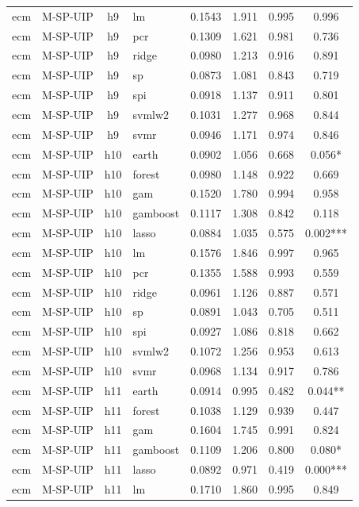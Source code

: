 \begin{ThreePartTable}
\begin{longtable}[t]{llclcccc}
ecm & M-SP-UIP & h9 & lm & 0.1543 & 1.911 & 0.995 & 0.996\\
ecm & M-SP-UIP & h9 & pcr & 0.1309 & 1.621 & 0.981 & 0.736\\
ecm & M-SP-UIP & h9 & ridge & 0.0980 & 1.213 & 0.916 & 0.891\\
ecm & M-SP-UIP & h9 & sp & 0.0873 & 1.081 & 0.843 & 0.719\\
ecm & M-SP-UIP & h9 & spi & 0.0918 & 1.137 & 0.911 & 0.801\\
ecm & M-SP-UIP & h9 & svmlw2 & 0.1031 & 1.277 & 0.968 & 0.844\\
ecm & M-SP-UIP & h9 & svmr & 0.0946 & 1.171 & 0.974 & 0.846\\
\addlinespace
ecm & M-SP-UIP & h10 & earth & 0.0902 & 1.056 & 0.668 & 0.056*\\
ecm & M-SP-UIP & h10 & forest & 0.0980 & 1.148 & 0.922 & 0.669\\
ecm & M-SP-UIP & h10 & gam & 0.1520 & 1.780 & 0.994 & 0.958\\
ecm & M-SP-UIP & h10 & gamboost & 0.1117 & 1.308 & 0.842 & 0.118\\
ecm & M-SP-UIP & h10 & lasso & 0.0884 & 1.035 & 0.575 & 0.002***\\
ecm & M-SP-UIP & h10 & lm & 0.1576 & 1.846 & 0.997 & 0.965\\
ecm & M-SP-UIP & h10 & pcr & 0.1355 & 1.588 & 0.993 & 0.559\\
ecm & M-SP-UIP & h10 & ridge & 0.0961 & 1.126 & 0.887 & 0.571\\
ecm & M-SP-UIP & h10 & sp & 0.0891 & 1.043 & 0.705 & 0.511\\
ecm & M-SP-UIP & h10 & spi & 0.0927 & 1.086 & 0.818 & 0.662\\
ecm & M-SP-UIP & h10 & svmlw2 & 0.1072 & 1.256 & 0.953 & 0.613\\
ecm & M-SP-UIP & h10 & svmr & 0.0968 & 1.134 & 0.917 & 0.786\\
\addlinespace
ecm & M-SP-UIP & h11 & earth & 0.0914 & 0.995 & 0.482 & 0.044**\\
ecm & M-SP-UIP & h11 & forest & 0.1038 & 1.129 & 0.939 & 0.447\\
ecm & M-SP-UIP & h11 & gam & 0.1604 & 1.745 & 0.991 & 0.824\\
ecm & M-SP-UIP & h11 & gamboost & 0.1109 & 1.206 & 0.800 & 0.080*\\
ecm & M-SP-UIP & h11 & lasso & 0.0892 & 0.971 & 0.419 & 0.000***\\
ecm & M-SP-UIP & h11 & lm & 0.1710 & 1.860 & 0.995 & 0.849\\

\end{longtable}
\end{ThreePartTable}
